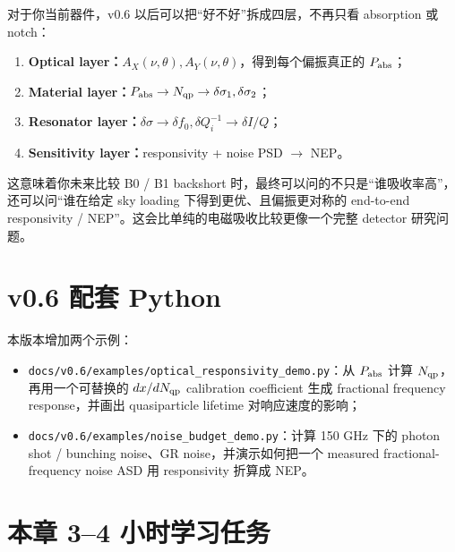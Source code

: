 \documentclass[11pt,a4paper,openany]{ctexrep}
\begin{document}
\begin{projectbox}
对于你当前器件，v0.6 以后可以把“好不好”拆成四层，不再只看 absorption 或 notch：
\begin{enumerate}
  \item \textbf{Optical layer：}$A_X(\nu,\theta),A_Y(\nu,\theta)$，得到每个偏振真正的 $P_{\rm abs}$；
  \item \textbf{Material layer：}$P_{\rm abs}\rightarrow N_{\rm qp}\rightarrow\delta\sigma_1,\delta\sigma_2$；
  \item \textbf{Resonator layer：}$\delta\sigma\rightarrow\delta f_0,\delta Q_i^{-1}\rightarrow\delta I/Q$；
  \item \textbf{Sensitivity layer：}responsivity + noise PSD $\rightarrow$ NEP。
\end{enumerate}
这意味着你未来比较 B0 / B1 backshort 时，最终可以问的不只是“谁吸收率高”，还可以问“谁在给定 sky loading 下得到更优、且偏振更对称的 end-to-end responsivity / NEP”。这会比单纯的电磁吸收比较更像一个完整 detector 研究问题。
\end{projectbox}

\section{v0.6 配套 Python}

本版本增加两个示例：
\begin{itemize}
  \item \texttt{docs/v0.6/examples/optical\_responsivity\_demo.py}：从 $P_{\rm abs}$ 计算 $N_{\rm qp}$，再用一个可替换的 $dx/dN_{\rm qp}$ calibration coefficient 生成 fractional frequency response，并画出 quasiparticle lifetime 对响应速度的影响；
  \item \texttt{docs/v0.6/examples/noise\_budget\_demo.py}：计算 150 GHz 下的 photon shot / bunching noise、GR noise，并演示如何把一个 measured fractional-frequency noise ASD 用 responsivity 折算成 NEP。
\end{itemize}

\section{本章 3--4 小时学习任务}
\end{document}
